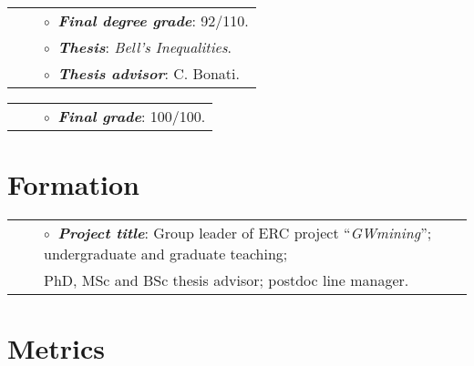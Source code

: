 \vspace{0.2cm}
\vspace{-0.1cm}
\begin{tabular}{rcl}
&\hspace{0.4cm} &$\circ\;\;${\textbf{\textit{Final degree grade}}}: 92/110.\\
&\hspace{0.4cm} &$\circ\;\;${\textbf{\textit{Thesis}}}: \textit{Bell's Inequalities}.\\
&\hspace{0.4cm} &$\circ\;\;${\textbf{\textit{Thesis advisor}}}:  C. Bonati.\\
\end{tabular}


\vspace{0.2cm}
\vspace{-0.1cm}
\begin{tabular}{rcl}
&\hspace{0.4cm} &$\circ\;\;${\textbf{\textit{Final grade}}}:  100/100.\\
\end{tabular}


\section{Formation}

\vspace{-0.1cm}
\begin{tabular}{rcl}
&\hspace{0.4cm} &$\circ\;\;${\textbf{\textit{Project title}}}: Group leader of ERC project ``\textit{GWmining}''; undergraduate and graduate teaching; \\&\hspace{0.4cm} &
\hspace{0.4cm}
PhD, MSc and BSc thesis advisor; postdoc line manager.
\end{tabular}
\vspace{0.2cm}


\section{Metrics}

